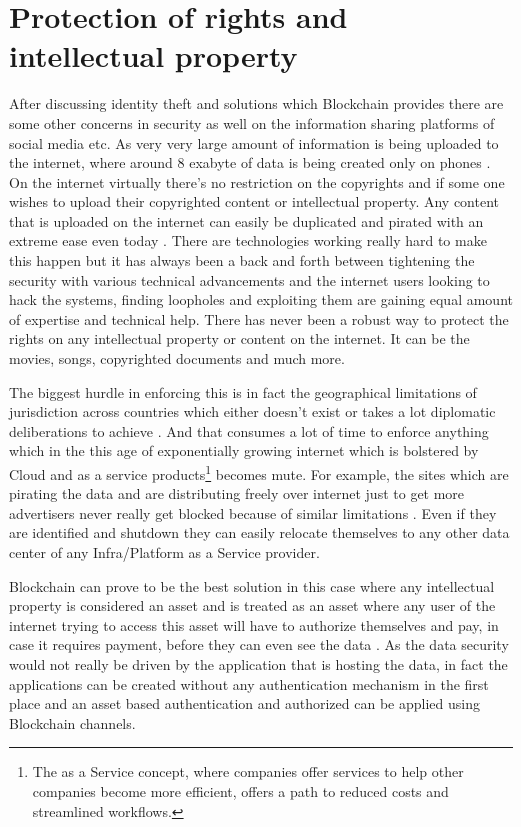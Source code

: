 \section{Protection of rights and intellectual property}
After discussing identity theft and solutions which Blockchain provides there are some other concerns in security as well on the information sharing platforms of social media etc. As very very large amount of information is being uploaded to the internet, where around 8 exabyte of data is being created only on phones \cite{jeff26}. On the internet virtually there's no restriction on the copyrights and if some one wishes to upload their copyrighted content or intellectual property. Any content that is uploaded on the internet can easily be duplicated and pirated with an extreme ease even today \cite{anita27}. There are technologies working really hard to make this happen but it has always been a back and forth between tightening the security with various technical advancements and the internet users looking to hack the systems, finding loopholes and exploiting them are gaining equal amount of expertise and technical help. There has never been a robust way to protect the rights on any intellectual property or content on the internet. It can be the movies, songs, copyrighted documents and much more.

The biggest hurdle in enforcing this is in fact the geographical limitations of jurisdiction across countries which either doesn't exist or takes a lot diplomatic deliberations to achieve \cite{anita27}. And that consumes a lot of time to enforce anything which in the this age of exponentially growing internet which is bolstered by Cloud and as a service products\footnote{The as a Service concept, where companies offer services to help other companies become more efficient, offers a path to reduced costs and streamlined workflows.} becomes mute. For example, the sites which are pirating the data and are distributing freely over internet just to get more advertisers never really get blocked because of similar limitations \cite{ian28}. Even if they are identified  and shutdown they can easily relocate themselves to any other data center of any Infra/Platform as a Service provider.

Blockchain can prove to be the best solution in this case where any intellectual property is considered an asset and is treated as an asset where any user of the internet trying to access this asset will have to authorize themselves and pay, in case it requires payment, before they can even see the data \cite{bitcoinist29}. As the data security would not really be driven by the application that is hosting the data, in fact the applications can be created without any authentication mechanism in the first place and an asset based authentication and authorized can be applied using Blockchain channels.


